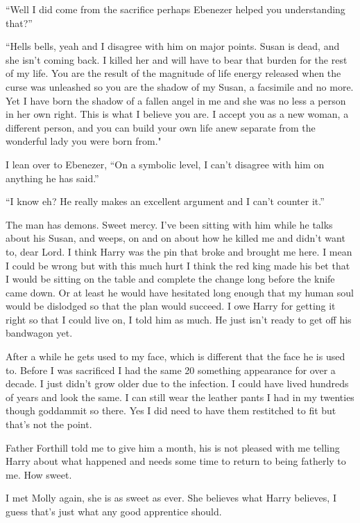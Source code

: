 ``Well I did come from the sacrifice perhaps Ebenezer helped you understanding that?''

``Hells bells, yeah and I disagree with him on major points. Susan is dead, and she isn't coming back. I killed her and will have to bear that burden for the rest of my life. You are the result of the magnitude of life energy released when the curse was unleashed so you are the shadow of my Susan, a facsimile and no more. Yet I have born the shadow of a fallen angel in me and she was no less a person in her own right. This is what I believe you are. I accept you as a new woman, a different person, and you can build your own life anew separate from the wonderful lady you were born from."

I lean over to Ebenezer, ``On a symbolic level, I can't disagree with him on anything he has said.''

``I know eh? He really makes an excellent argument and I can't counter it.''

\parasep

The man has demons. Sweet mercy. I've been sitting with him while he talks about his Susan, and weeps, on and on about how he killed me and didn't want to, dear Lord. I think Harry was the pin that broke and brought me here. I mean I could be wrong but with this much hurt I think the red king made his bet that I would be sitting on the table and complete the change long before the knife came down. Or at least he would have hesitated long enough that my human soul would be dislodged so that the plan would succeed. I owe Harry for getting it right so that I could live on, I told him as much. He just isn't ready to get off his bandwagon yet.

After a while he gets used to my face, which is different that the face he is used to. Before I was sacrificed I had the same 20 something appearance for over a decade. I just didn't grow older due to the infection. I could have lived hundreds of years and look the same. I can still wear the leather pants I had in my twenties though goddammit so there. Yes I did need to have them restitched to fit but that's not the point.

Father Forthill told me to give him a month, his is not pleased with me telling Harry about what happened and needs some time to return to being fatherly to me. How sweet.

I met Molly again, she is as sweet as ever. She believes what Harry believes, I guess that's just what any good apprentice should.

